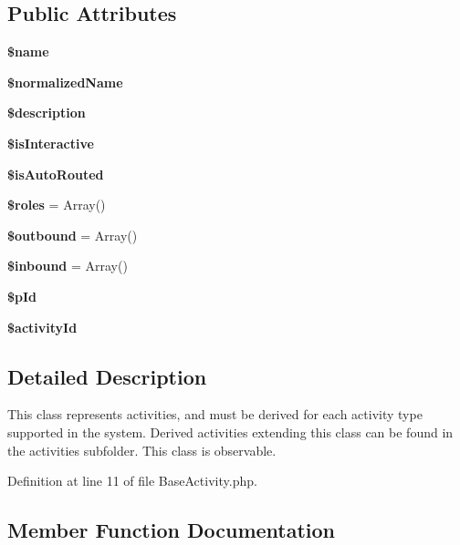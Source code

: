 \subsection*{Public Attributes}
\begin{CompactItemize}
\item 
{\bf \$name}\label{classBaseActivity_o0}

\item 
{\bf \$normalized\-Name}\label{classBaseActivity_o1}

\item 
{\bf \$description}\label{classBaseActivity_o2}

\item 
{\bf \$is\-Interactive}\label{classBaseActivity_o3}

\item 
{\bf \$is\-Auto\-Routed}\label{classBaseActivity_o4}

\item 
{\bf \$roles} = Array()\label{classBaseActivity_o5}

\item 
{\bf \$outbound} = Array()\label{classBaseActivity_o6}

\item 
{\bf \$inbound} = Array()\label{classBaseActivity_o7}

\item 
{\bf \$p\-Id}\label{classBaseActivity_o8}

\item 
{\bf \$activity\-Id}\label{classBaseActivity_o9}

\end{CompactItemize}


\subsection{Detailed Description}
This class represents activities, and must be derived for each activity type supported in the system. Derived activities extending this class can be found in the activities subfolder. This class is observable. 



Definition at line 11 of file Base\-Activity.php.

\subsection{Member Function Documentation}
